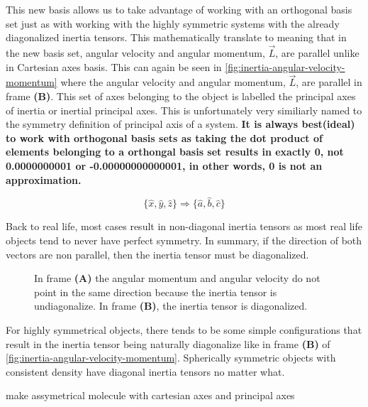 \documentclass[11pt,a4paper]{book}
\newcommand{\imginput}[1]{} %
\begin{document}
			This new basis allows us to take advantage of working with an orthogonal basis set just as with working with the highly symmetric systems with the already diagonalized inertia tensors. This mathematically translate to meaning that in the new basis set, angular velocity and angular momentum, $\vec{L}$, are parallel unlike in Cartesian axes basis. This can again be seen in \autoref{fig:inertia-angular-velocity-momentum} where the angular velocity and angular momentum, $\vec{L}$, are parallel in frame \textbf{(B)}. This set of axes belonging to the object is labelled the principal axes of inertia or inertial principal axes. This is unfortunately very similiarly named to the symmetry definition of principal axis of a system. {\bfseries It is always best(ideal) to work with orthogonal basis sets as taking the dot product of elements belonging to a orthongal basis set results in exactly 0, not 0.0000000001 or -0.00000000000001, in other words, 0 is not an approximation.} 
			
			
			\begin{equation*}
				\{\hat{x}, \hat{y}, \hat{z}\} \Longrightarrow \{\hat{a}, \hat{b}, \hat{c}\}
			\end{equation*}
			
			Back to real life, most cases result in non-diagonal inertia tensors as most real life objects tend to never have perfect symmetry. In summary, if the direction of both vectors are non parallel, then the inertia tensor must be diagonalized.
			
			\begin{figure} [!ht]
				\centering
				\large
				\def\svgwidth{\columnwidth}
				\resizebox{16cm}{!}{\imginput{images/inertia-angular-velocity-momentum.pdf_tex}}
				\caption{In frame \textbf{(A)} the angular momentum and angular velocity do not point in the same direction because the inertia tensor is undiagonalize. In frame \textbf{(B)}, the inertia tensor is diagonalized.}
				\label{fig:inertia-angular-velocity-momentum}
			\end{figure}
			
			For highly symmetrical objects, there tends to be some simple configurations that result in the inertia tensor being naturally diagonalize like in frame \textbf{(B)} of \autoref{fig:inertia-angular-velocity-momentum}. Spherically symmetric objects with consistent density have diagonal inertia tensors no matter what.
			
			make assymetrical molecule with cartesian axes and principal axes
	
\end{document}
